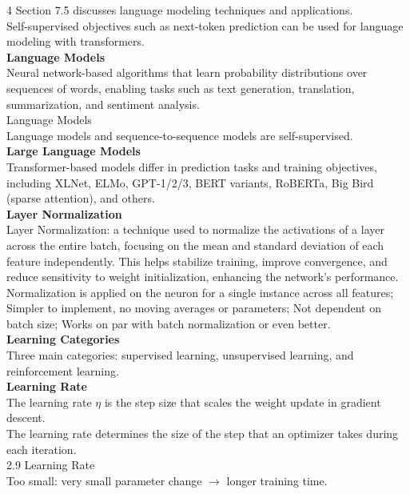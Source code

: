 \documentclass[8pt]{extarticle}
\begin{document}
\begin{multicols}{4}
{Section 7.5 discusses language modeling techniques and applications.\\
Self-supervised objectives such as next-token prediction can be used for language modeling with transformers.\\
\vspace{2pt}\textbf{Language Models}\\
Neural network-based algorithms that learn probability distributions over sequences of words, enabling tasks such as text generation, translation, summarization, and sentiment analysis.\\
Language Models\\
Language models and sequence-to-sequence models are self-supervised.\\
\vspace{2pt}\textbf{Large Language Models}\\
Transformer-based models differ in prediction tasks and training objectives, including XLNet, ELMo, GPT-1/2/3, BERT variants, RoBERTa, Big Bird (sparse attention), and others.\\
\vspace{2pt}\textbf{Layer Normalization}\\
Layer Normalization: a technique used to normalize the activations of a layer across the entire batch, focusing on the mean and standard deviation of each feature independently. This helps stabilize training, improve convergence, and reduce sensitivity to weight initialization, enhancing the network's performance.\\
Normalization is applied on the neuron for a single instance across all features; Simpler to implement, no moving averages or parameters; Not dependent on batch size; Works on par with batch normalization or even better.\\
\vspace{2pt}\textbf{Learning Categories}\\
Three main categories: supervised learning, unsupervised learning, and reinforcement learning.\\
\vspace{2pt}\textbf{Learning Rate}\\
The learning rate $\eta$ is the step size that scales the weight update in gradient descent.\\
The learning rate determines the size of the step that an optimizer takes during each iteration.\\
2.9 Learning Rate\\
Too small: very small parameter change $\rightarrow$ longer training time.\\
}
\end{multicols}
\end{document}
